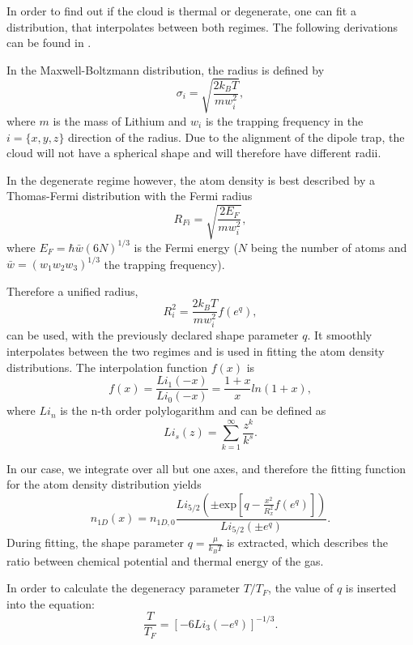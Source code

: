 In order to find out if the cloud is thermal or degenerate, one can fit a distribution, that interpolates between both regimes. The following derivations can be found in \cite{Ketterle2008}.

In the Maxwell-Boltzmann distribution, the radius is defined by
\begin{equation}
\sigma _i = \sqrt{\frac{2k_BT}{mw_i^2}},
\end{equation}
where $m$ is the mass of Lithium and $w_i$ is the trapping frequency in the $i=\{x,y,z\}$ direction of the radius. Due to the alignment of the dipole trap, the cloud will not have a spherical shape and will therefore have different radii\cite{Heck2012}.

In the degenerate regime however, the atom density is best described by a Thomas-Fermi distribution with the Fermi radius
\begin{equation}
R_{Fi} = \sqrt{\frac{2E_F}{mw_i^2}},
\end{equation}
where $E_F=\hbar \bar{w} (6N)^{1/3}$ is the Fermi energy ($N$ being the number of atoms and $\bar{w}=(w_1 w_2 w_3)^{1/3}$ the trapping frequency).

Therefore a unified radius,
\begin{equation}
R_i^2 = \frac{2k_BT}{mw_i^2}f( e^{q}),
\end{equation}
can be used, with the previously declared shape parameter $q$. It smoothly interpolates between the two regimes and is used in fitting the atom density distributions.
The interpolation function $f(x)$ is
\begin{equation}
f(x) = \frac{Li_1(-x)}{Li_0(-x)} = \frac{1+x}{x} ln(1+x),
\end{equation}
where $Li_n$ is the n-th order polylogarithm and can be defined as
\begin{equation}
Li_s(z) = \sum_{k=1}^{\infty} \frac{z^k}{k^s}.
\end{equation}

In our case, we integrate over all but one axes, and therefore the fitting function for the atom density distribution yields
\begin{equation}
\label{eq:n1d}
n_{1D}(x) = n_{1D,0}\frac{Li_{5/2}\left( \pm \mathrm{exp}\left[ q-\frac{x^2}{R_x^2}f(e^q)\right] \right)}{Li_{5/2}(\pm e^q)}.
\end{equation}
During fitting, the shape parameter $q=\frac{\mu}{k_B T}$ is extracted, which describes the ratio between chemical potential and thermal energy of the gas.

In order to calculate the degeneracy parameter $T/T_F$, the value of $q$ is inserted into the equation:
\begin{equation}
\label{eq:tovertf}
\frac{T}{T_F} = \left[ -6 Li_3(-e^q) \right]^{-1/3}.
\end{equation}

